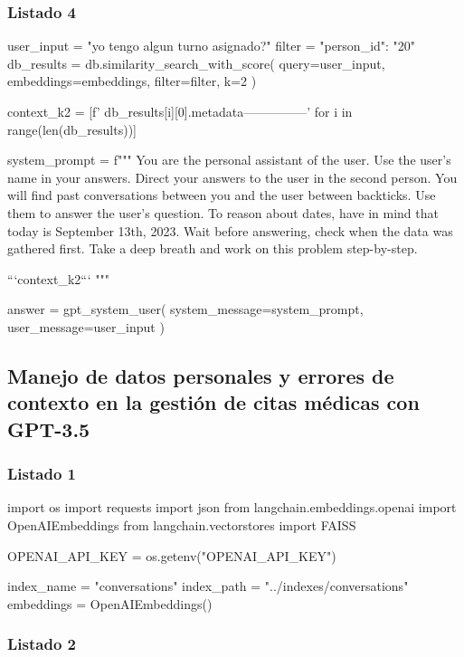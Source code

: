 \subsubsection{Listado 4}
\label{anexo:code-4-1-15-4}

\begin{APACode}
user_input = "yo tengo algun turno asignado?"
filter = {"person_id": "20"}
db_results = db.similarity_search_with_score(
    query=user_input, 
    embeddings=embeddings, 
    filter=filter, 
    k=2
)

context_k2 = [f' 
               {db_results[i][0].metadata}\n---------------\n\n' 
               for i in range(len(db_results))]

system_prompt = f"""
You are the personal assistant of the user.
Use the user's name in your answers.
Direct your answers to the user in the second person.
You will find past conversations between you and the user between backticks. 
Use them to answer the user's question.
To reason about dates, have in mind that today is September 13th, 2023. 
Wait before answering, check when the data was gathered first.
Take a deep breath and work on this problem step-by-step.

```{context_k2}```
"""

answer = gpt_system_user(
    system_message=system_prompt, 
    user_message=user_input
)
\end{APACode}

\subsection{Manejo de datos personales y errores de contexto en la gestión de citas médicas con GPT-3.5}

\subsubsection{Listado 1}
\label{anexo:code-4-1-16-1}

\begin{APACode}
import os
import requests 
import json
from langchain.embeddings.openai import OpenAIEmbeddings 
from langchain.vectorstores import FAISS

OPENAI_API_KEY = os.getenv("OPENAI_API_KEY")

index_name = "conversations"
index_path = "../indexes/conversations" 
embeddings = OpenAIEmbeddings()
\end{APACode}

\subsubsection{Listado 2}
\label{anexo:code-4-1-16-2}

